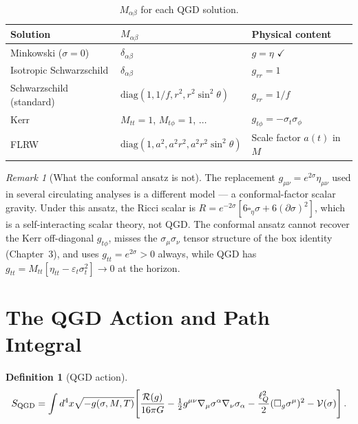 \documentclass[11pt,a4paper]{article}
\theoremstyle{plain}
\theoremstyle{definition}
\newtheorem{definition}[theorem]{Definition}
\theoremstyle{remark}
\newtheorem{remark}[theorem]{Remark}
\newcommand{\lQ}{\ell_Q}
\newcommand{\half}{\tfrac{1}{2}}
\newcommand{\sigt}{\sigma_t}
\begin{document}
\begin{table}[h]
\centering\small\renewcommand{\arraystretch}{1.3}
\caption{$M_{\alpha\beta}$ for each QGD solution.}
\label{tab:M}
\begin{tabular}{@{}p{3.5cm}p{4.5cm}p{5cm}@{}}
\toprule
Solution & $M_{\alpha\beta}$ & Physical content \\
\midrule
Minkowski ($\sigma=0$) & $\delta_{\alpha\beta}$ & $g=\eta$ $\checkmark$ \\
Isotropic Schwarzschild & $\delta_{\alpha\beta}$ & $g_{rr}=1$ \\
Schwarzschild (standard) & $\mathrm{diag}(1,1/f,r^2,r^2\sin^2\theta)$ &
  $g_{rr}=1/f$ \\
Kerr & $M_{tt}=1$, $M_{t\phi}=1$, $\ldots$ & $g_{t\phi}=-\sigma_t\sigma_\phi$ \\
FLRW & $\mathrm{diag}(1,a^2,a^2r^2,a^2r^2\sin^2\theta)$ &
  Scale factor $a(t)$ in $M$ \\
\bottomrule
\end{tabular}
\end{table}

\begin{remark}[What the conformal ansatz is not]
The replacement $g_{\mu\nu}=e^{2\sigma}\eta_{\mu\nu}$ used in several
circulating analyses is a different model --- a conformal-factor scalar gravity.
Under this ansatz, the Ricci scalar is
$R=e^{-2\sigma}[6\square_\eta\sigma+6(\partial\sigma)^2]$, which is
a self-interacting scalar theory, not QGD.  The conformal ansatz cannot
recover the Kerr off-diagonal $g_{t\phi}$, misses the
$\sigma_\mu\sigma_\nu$ tensor structure of the box identity (Chapter~3),
and uses $g_{tt}=e^{2\sigma}>0$ always, while QGD has
$g_{tt}=M_{tt}[\eta_{tt}-\varepsilon_t\sigt^2]\to0$ at the horizon.
\end{remark}

\section{The QGD Action and Path Integral}
\label{sec:action}

\begin{definition}[QGD action]\label{def:action}
\begin{equation}
  S_{\rm QGD} = \int d^4x\sqrt{-g(\sigma,M,T)}\!\left[
    \frac{\mathcal{R}(g)}{16\pi G}
    -\half g^{\mu\nu}\nabla_\mu\sigma^\alpha\nabla_\nu\sigma_\alpha
    -\frac{\lQ^2}{2}(\square_g\sigma^\mu)^2
    - \mathcal{V}(\sigma)
  \right].
  \label{eq:S_QGD}
\end{equation}
\end{definition}
\end{document}
